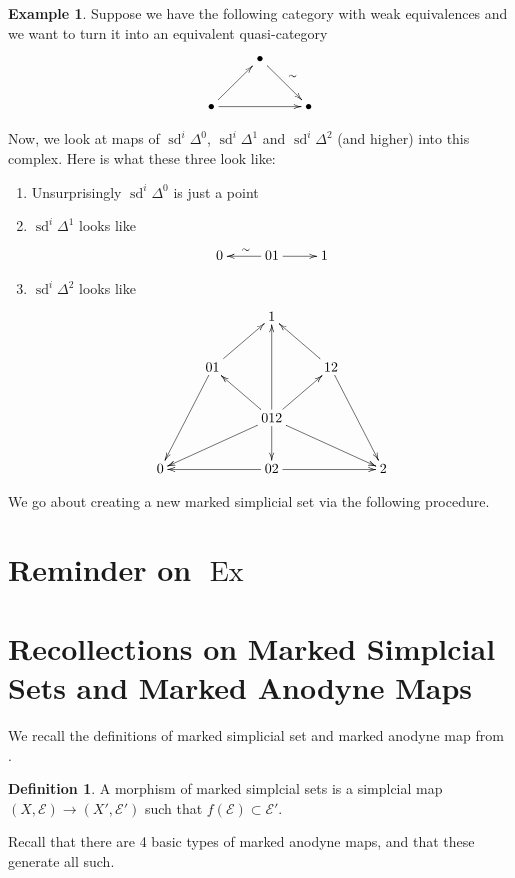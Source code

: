 \documentclass[english]{amsart}
\newcommand{\mc}{\mathcal}
\theoremstyle{definition}
\newtheorem*{defn}{Definition}
\newtheorem*{example}{Example}
\begin{document}
\begin{example}
Suppose we have the following category with weak equivalences and we want to turn it into an equivalent quasi-category
\[
\xymatrix{
 & \bullet \ar[dr]^\sim & \\
\bullet \ar[ur] \ar[rr] & & \bullet
}
\]

Now, we look at maps of $\operatorname{sd}^i \Delta^0$, $\operatorname{sd}^i \Delta^1$ and $\operatorname{sd}^i \Delta^2$ (and higher) into this complex. Here is what these three look like: 

\begin{enumerate}
\item Unsurprisingly $\operatorname{sd}^i \Delta^0$ is just a point
\item $\operatorname{sd}^i \Delta^1$ looks like
\[
\xymatrix{
0 & 01 \ar[l]_\sim \ar[r] & 1
}
\]
\item $\operatorname{sd}^i \Delta^2$ looks like
\[
\xymatrix{
 & & 1 & & \\
 & 01\ar[ur]\ar[ddl] & & 12 \ar[ul]\ar[ddr]& \\
 & & 012\ar[uu]\ar[dll]\ar[drr] \ar[ul]\ar[ur]\ar[d] & & \\
0 & &02\ar[ll]\ar[rr] & & 2
} 
\]
\end{enumerate}
\end{example}

We go about creating a new marked simplicial set via the following procedure. 





\section{Reminder on $\operatorname{Ex}$}

\section{Recollections on Marked Simplcial Sets and Marked Anodyne Maps}

We recall the definitions of marked simplicial set and marked anodyne map from \cite{Lurie:2009tn}. 

\begin{defn}
A morphism of marked simplcial sets is a simplcial map $(X, \mc{E}) \to (X',\mc{E}')$ such that $f(\mc{E}) \subset \mc{E}'$. 
\end{defn}

Recall that there are 4 basic types of marked anodyne maps, and that these generate all such. 
\end{document}
